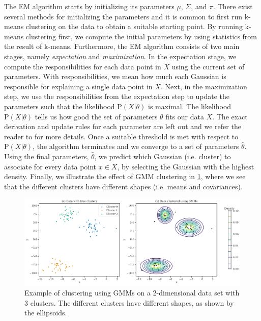 The EM algorithm starts by initializing its parameters $\mu$, $\Sigma$, and $\pi$. There exist several methods for initializing the parameters and it is common to first run k-means clustering on the data to obtain a suitable starting point. By running k-means clustering first, we compute the initial parameters by using statistics from the result of k-means. Furthermore, the EM algorithm consists of two main stages, namely \textit{expectation} and \textit{maximization}. In the expectation stage, we compute the responsibilities for each data point in $X$ using the current set of parameters. With responsibilities, we mean how much each Gaussian is responsible for explaining a single data point in $X$. Next, in the maximization step, we use the responsibilities from the expectation step to update the parameters such that the likelihood $\text{P}(X | \theta)$ is maximal. The likelihood $\text{P}(X | \theta)$ tells us how good the set of parameters $\theta$ fits our data $X$. The exact derivation and update rules for each parameter are left out and we refer the reader to \cite[Section 9.4]{bishop2006} for more details. Once a suitable threshold is met with respect to $\text{P}(X | \theta)$, the algorithm terminates and we converge to a set of parameters $\hat{\theta}$. Using the final parameters, $\hat{\theta}$, we predict which Gaussian (i.e. cluster) to associate for every data point $x \in X$, by selecting the Gaussian with the highest density. Finally, we illustrate the effect of GMM clustering in \cref{fig:k-gmm-clustering-2d-example}, where we see that the different clusters have different shapes (i.e. means and covariances).
\begin{figure}[H]
    \centering
    \includegraphics[width=\textwidth]{thesis/figures/k-gmm-clustering-2d-example.pdf}
    \caption{Example of clustering using GMMs on a 2-dimensional data set with 3 clusters. The different clusters have different shapes, as shown by the ellipsoids.}
    \label{fig:k-gmm-clustering-2d-example}
\end{figure}

